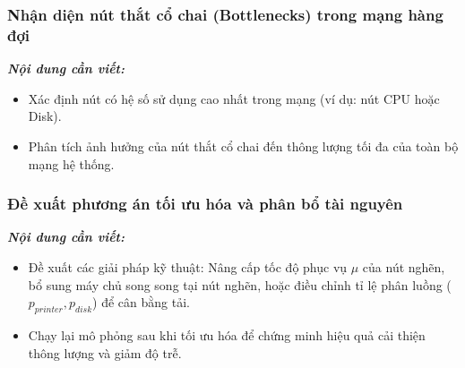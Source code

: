 \subsubsection{Nhận diện nút thắt cổ chai (Bottlenecks) trong mạng hàng đợi}
\textit{\textbf{Nội dung cần viết:}}
\begin{itemize}[leftmargin=1.5em]
    \item Xác định nút có hệ số sử dụng cao nhất trong mạng (ví dụ: nút CPU hoặc Disk).
    \item Phân tích ảnh hưởng của nút thắt cổ chai đến thông lượng tối đa của toàn bộ mạng hệ thống.
\end{itemize}

\subsubsection{Đề xuất phương án tối ưu hóa và phân bổ tài nguyên}
\textit{\textbf{Nội dung cần viết:}}
\begin{itemize}[leftmargin=1.5em]
    \item Đề xuất các giải pháp kỹ thuật: Nâng cấp tốc độ phục vụ $\mu$ của nút nghẽn, bổ sung máy chủ song song tại nút nghẽn, hoặc điều chỉnh tỉ lệ phân luồng ($p_{printer}, p_{disk}$) để cân bằng tải.
    \item Chạy lại mô phỏng sau khi tối ưu hóa để chứng minh hiệu quả cải thiện thông lượng và giảm độ trễ.
\end{itemize}
